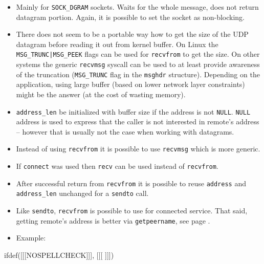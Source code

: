 \begin{itemize}
\item Mainly for \texttt{SOCK\_DGRAM} sockets. Waits for the whole message,
does not return datagram portion. Again, it is possible to set the socket
as non-blocking.
\item There does not seem to be a portable way how to get the size of the
UDP datagram before reading it out from kernel buffer. On Linux the
\texttt{MSG\_TRUNC|MSG\_PEEK} flags can be used for \texttt{recvfrom} to get the
size. On other systems the generic \texttt{recvmsg} syscall can be used to at
least provide awareness of the truncation (\texttt{MSG\_TRUNC} flag in the
\texttt{msghdr} structure).
Depending on the application, using large buffer (based on lower network layer
constraints) might be the answer (at the cost of wasting memory).
\item \texttt{address\_len}  be initialized with buffer size if
the address is not \texttt{NULL}. \texttt{NULL} address is used to express that
the caller is not interested in remote's address -- however that is usually
not the case when working with datagrams.
\item Instead of using \texttt{recvfrom} it is possible to use
\texttt{recvmsg} which is more generic.
\item If \texttt{connect} was used then \texttt{recv} can be used instead of
\texttt{recvfrom}.
\item After successful return from \texttt{recvfrom} it is possible to reuse
\texttt{address} and \texttt{address\_len} unchanged for a \texttt{sendto} call.
\item Like \texttt{sendto}, \texttt{recvfrom} is possible to use for connected
service. That said, getting remote's address is better via
\texttt{getpeername}, see page \pageref{GETPEERNAME}.
\item Example: \label{UDP_SERVER_C} 
\end{itemize}


ifdef([[[NOSPELLCHECK]]], [[[
]]])

